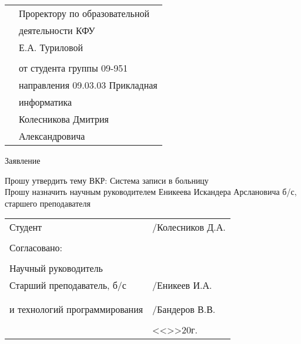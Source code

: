\documentclass[a4paper]{article}
\begin{document}
    \begin{titlepage}
        \begin{xltabular}{\textwidth} {
                >{\hsize} X
                >{\hsize} X }
            & Проректору по образовательной \\
            & деятельности КФУ \\
            & Е.А. Туриловой \\
            & \\
            & от студента группы 09-951 \\
            & направления 09.03.03 Прикладная \\
            & информатика \\
            & Колесникова Дмитрия \\
            & Александровича \\
        \end{xltabular}

        \begin{center}
            Заявление
        \end{center}

        \begin{flushleft}
            Прошу утвердить тему ВКР: Система записи в больницу \\
            Прошу назначить научным руководителем Еникеева Искандера Арслановича б/с, старшего преподавателя
        \end{flushleft}

        \vfill

        \begin{xltabular}{\textwidth} {
                >{\hsize} X
                >{\hsize} X }
            Студент & \underline{\hspace{3cm}}/Колесников Д.А. \\
            & \\
            Согласовано: & \\
            & \\
            Научный руководитель & \\
            Старший преподаватель, б/с & \underline{\hspace{3cm}}/Еникеев И.А. \\
            & \\
             \\
            и технологий программирования & \underline{\hspace{3cm}}/Бандеров В.В. \\
            & \\
            & <<\underline{\hspace{1cm}}>>\underline{\hspace{3cm}}20\underline{\hspace{1cm}}г. \\
        \end{xltabular}
    \end{titlepage}
\end{document}
